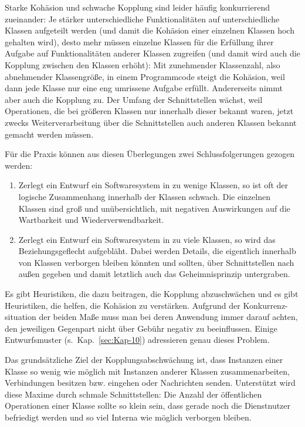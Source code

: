 Starke Kohäsion und schwache Kopplung sind leider häufig konkurrierend zueinander: Je stärker unterschiedliche Funktionalitäten auf unterschiedliche Klassen aufgeteilt werden (und damit die Kohäsion einer einzelnen Klassen hoch gehalten wird), desto mehr müssen einzelne Klassen für die Erfüllung ihrer Aufgabe auf Funktionalitäten anderer Klassen zugreifen (und damit wird auch die Kopplung zwischen den Klassen erhöht): Mit zunehmender Klassenzahl, also abnehmender Klassengröße, in einem Programm\-code steigt die Kohäsion, weil dann jede Klasse nur eine eng umrissene Aufgabe erfüllt. Andererseits nimmt aber auch die Kopplung zu. Der Umfang der Schnittstellen wächst, weil Operationen, die bei größeren Klassen nur innerhalb dieser bekannt waren, jetzt zwecks Weiterverarbeitung über die Schnittstellen auch anderen Klassen bekannt gemacht werden müssen.

Für die Praxis können aus diesen Überlegungen zwei Schlussfolgerungen gezogen werden:

\begin{enumerate}
	\item Zerlegt ein Entwurf ein Softwaresystem in zu wenige Klassen, so ist oft der logische Zusammenhang innerhalb der Klassen schwach. Die einzelnen Klassen sind groß und unübersichtlich, mit negativen Auswirkungen auf die Wartbarkeit und Wiederverwendbarkeit.
	\item Zerlegt ein Entwurf ein Softwaresystem in zu viele Klassen, so wird das 
	\linebreak %
	Beziehungsgeflecht aufgebläht. Dabei werden Details, die eigentlich innerhalb von Klassen verborgen bleiben könnten und sollten, über Schnittstellen nach außen gegeben und damit letztlich auch das Geheimnisprinzip untergraben.
\end{enumerate}

Es gibt Heuristiken, die dazu beitragen, die Kopplung abzuschwächen und es gibt Heuristiken, die helfen, die Kohäsion zu verstärken. Aufgrund der Konkurrenz-
\linebreak %
situation der beiden Maße muss man bei deren Anwendung immer darauf achten, den jeweiligen Gegenpart nicht über Gebühr negativ zu beeinflussen. Einige Entwurfs\-muster (s.~Kap.~\ref{sec:Kap-10}) adressieren genau dieses Problem.


Das grundsätzliche Ziel der Kopplungsabschwächung ist, dass Instanzen einer Klasse so wenig wie möglich mit Instanzen anderer Klassen zusammenarbeiten, \dasHeisst Verbindungen besitzen bzw. eingehen oder Nachrichten senden.  Unterstützt wird diese Maxime durch schmale Schnittstellen: Die Anzahl der öffentlichen Operationen einer Klasse sollte so klein sein, dass gerade noch die Dienstnutzer befriedigt werden und so viel Interna wie möglich verborgen bleiben.

